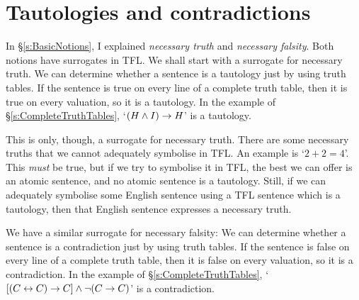 \section{Tautologies and contradictions}
In \S\ref{s:BasicNotions}, I explained \emph{necessary truth} and \emph{necessary falsity}. Both notions have surrogates in TFL. We shall start with a surrogate for necessary truth.
We can determine whether a sentence is a tautology just by using truth tables. If the sentence is true on every line of a complete truth table, then it is true on every valuation, so it is a tautology. In the example of \S\ref{s:CompleteTruthTables}, `$(H \wedge I) \rightarrow H$' is a tautology. 

This is only, though, a surrogate for necessary truth. There are some necessary truths that we cannot adequately symbolise in TFL. An example is `$2 + 2 = 4$'. This \emph{must} be true, but if we try to symbolise it in TFL, the best we can offer is an atomic sentence, and no atomic sentence is a tautology. Still, if we can adequately symbolise some English sentence using a TFL sentence which is a tautology, then that English sentence expresses a necessary truth.

We have a similar surrogate for necessary falsity:
We can determine whether a sentence is a contradiction just by using truth tables. If the sentence is false on every line of a complete truth table, then it is false on every valuation, so it is a contradiction. In the example of \S\ref{s:CompleteTruthTables}, `$[(C\leftrightarrow C) \rightarrow C] \wedge \neg(C \rightarrow C)$' is a contradiction.


